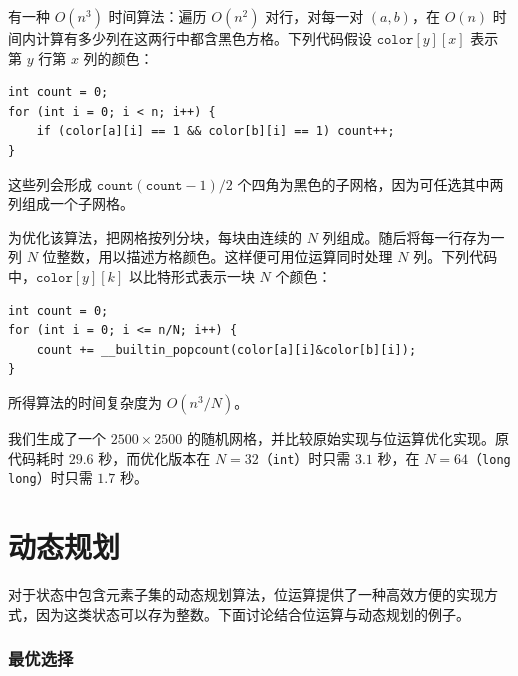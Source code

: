 有一种 $O(n^3)$ 时间算法：遍历 $O(n^2)$ 对行，对每一对 $(a,b)$，在 $O(n)$ 时间内计算有多少列在这两行中都含黑色方格。下列代码假设 $\texttt{color}[y][x]$ 表示第 $y$ 行第 $x$ 列的颜色：
\begin{lstlisting}
int count = 0;
for (int i = 0; i < n; i++) {
    if (color[a][i] == 1 && color[b][i] == 1) count++;
}
\end{lstlisting}
这些列会形成 $\texttt{count}(\texttt{count}-1)/2$ 个四角为黑色的子网格，因为可任选其中两列组成一个子网格。

为优化该算法，把网格按列分块，每块由连续的 $N$ 列组成。随后将每一行存为一列 $N$ 位整数，用以描述方格颜色。这样便可用位运算同时处理 $N$ 列。下列代码中，$\texttt{color}[y][k]$ 以比特形式表示一块 $N$ 个颜色：
\begin{lstlisting}
int count = 0;
for (int i = 0; i <= n/N; i++) {
    count += __builtin_popcount(color[a][i]&color[b][i]);
}
\end{lstlisting}
所得算法的时间复杂度为 $O(n^3/N)$。

我们生成了一个 $2500\times2500$ 的随机网格，并比较原始实现与位运算优化实现。原代码耗时 $29.6$ 秒，而优化版本在 $N=32$（\texttt{int}）时只需 $3.1$ 秒，在 $N=64$（\texttt{long long}）时只需 $1.7$ 秒。

\section{动态规划}

对于状态中包含元素子集的动态规划算法，位运算提供了一种高效方便的实现方式，因为这类状态可以存为整数。下面讨论结合位运算与动态规划的例子。

\subsubsection{最优选择}

